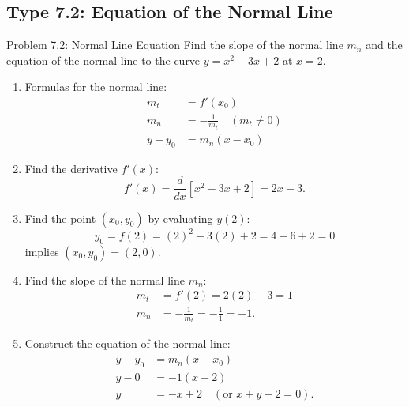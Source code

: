 \documentclass[11pt,a4paper]{article}
\begin{document}
\subsection{Type 7.2: Equation of the Normal Line}
\begin{problembox}{Problem 7.2: Normal Line Equation}
Find the slope of the normal line $m_n$ and the equation of the normal line to the curve $y = x^2 - 3x + 2$ at $x = 2$.
\end{problembox}
\begin{solutionbox}
\begin{enumerate}
	\item [Step 1.] Formulas for the normal line:
	\begin{align*}
		m_t &= f'(x_0) \\
		m_n &= -\frac{1}{m_t} \quad (m_t \neq 0) \\
		y - y_0 &= m_n(x - x_0)
	\end{align*}
	
	\item [Step 2.] Find the derivative $f'(x)$:
	\begin{equation}\label{eq;7.2.1}
		f'(x) = \frac{d}{dx}\left[x^2 - 3x + 2\right] = 2x - 3.
	\end{equation}

	\item [Step 3.] Find the point $(x_0, y_0)$ by evaluating $y(2)$:
	\begin{equation*}
		y_0 = f(2) = (2)^2 - 3(2) + 2 = 4 - 6 + 2 = 0
	\end{equation*}
	implies $(x_0, y_0) = (2, 0)$.

	\item [Step 4.] Find the slope of the normal line $m_n$:
	\begin{align*}
		m_t &= f'(2) = 2(2) - 3 = 1 \\
		m_n &= -\frac{1}{m_t} = -\frac{1}{1} = -1.
	\end{align*}

	\item [Step 5.] Construct the equation of the normal line:
	\begin{align*}
		y - y_0 &= m_n(x - x_0) \\
		y - 0 &= -1(x - 2) \\
		y &= -x + 2 \quad \left(\text{or } x + y - 2 = 0\right).
	\end{align*}
\end{enumerate}
\end{solutionbox}
\end{document}
